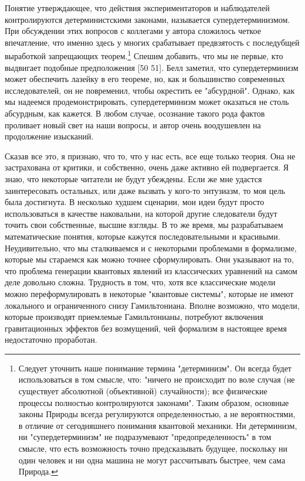 \documentclass[main.tex]{subfiles}
\begin{document}
Понятие утверждающее, что действия экспериментаторов и наблюдателей контролируются детерминистскими законами, называется супердетерминизмом. При обсуждении этих вопросов с коллегами у автора сложилось четкое впечатление, что именно здесь у многих срабатывает предвзятость с последубщей выработкой запрещающих теорем.\footnote{Следует уточнить наше понимание термина "детерминизм". Он всегда будет использоваться в том смысле, что: "ничего не происходит по воле случая (не существует абсолютной (объективной) случайности); все физические процессы полностью контролируются законами". Таким образом, основные законы Природы всегда регулируются определенностью, а не вероятностями, в отличие от сегодняшнего понимания квантовой механики. Ни детерминизм, ни "супердетерминизм" не подразумевают "предопределенность" в том смысле, что есть возможность точно предсказывать будущее, поскольку ни один человек и ни одна машина не могут рассчитывать быстрее, чем сама Природа.} Спешим добавить, что мы не первые, кто выдвигает подобные предположения [50 51]. Белл заметил, что супердетерминизм может обеспечить лазейку в его теореме, но, как и большинство современных исследователей, он не повременил, чтобы окрестить ее "абсурдной". Однако, как мы надеемся продемонстрировать, супердетерминизм может оказаться не столь абсурдным, как кажется. В любом случае, осознание такого рода фактов проливает новый свет на наши вопросы, и автор очень воодушевлен на продолжение изысканий. 

Сказав все это, я признаю, что то, что у нас есть, все еще только теория. Она не застрахована от критики, и собственно, очень даже активно ей подвергается. Я знаю, что некоторые читатели не будут убеждены. Если же мне удастся заинтересовать остальных, или даже вызвать у кого-то энтузиазм, то моя цель была достигнута. В несколько худшем сценарии, мои идеи будут просто использоваться в качестве наковальни, на которой другие следователи будут точить свои собственные, высшие взгляды. В то же время, мы разрабатываем математические понятия, которые кажутся последовательными и красивыми. Неудивительно, что мы сталкиваемся и с некоторыми проблемами в формализме, которые мы стараемся как можно точнее сформулировать. Они указывают на то, что проблема генерации квантовых явлений из классических уравнений на самом деле довольно сложна. Трудность в том, что, хотя все классические модели можно переформулировать в некоторые "квантовые системы", которые не имеют локального и ограниченного снизу Гамильтониана. Вполне возможно, что модели, которые производят приемлемые Гамильтонианы, потребуют включения гравитационных эффектов без возмущений, чей формализм в настоящее время недостаточно проработан.
\end{document}
